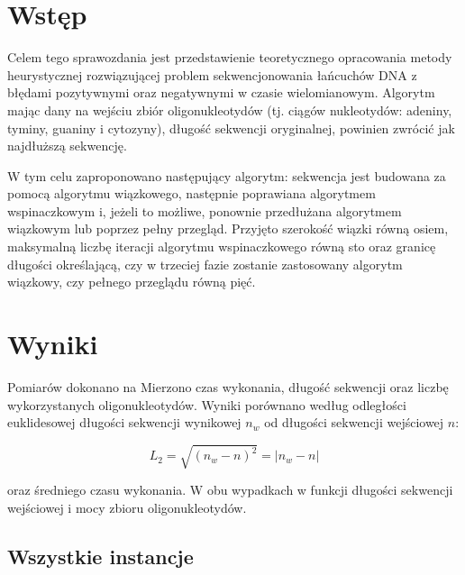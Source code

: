 \documentclass{article}
\begin{document}


\section{Wstęp}
Celem tego sprawozdania jest przedstawienie teoretycznego opracowania metody heurystycznej rozwiązującej problem sekwencjonowania łańcuchów DNA z błędami pozytywnymi oraz negatywnymi w czasie wielomianowym. Algorytm mając dany na wejściu zbiór oligonukleotydów (tj. ciągów nukleotydów: adeniny, tyminy, guaniny i cytozyny), długość sekwencji oryginalnej, powinien zwrócić jak najdłuższą sekwencję.

W tym celu zaproponowano następujący algorytm: sekwencja jest budowana za pomocą algorytmu wiązkowego, następnie poprawiana algorytmem wspinaczkowym i, jeżeli to możliwe, ponownie przedłużana algorytmem wiązkowym lub poprzez pełny przegląd. Przyjęto szerokość wiązki równą osiem, maksymalną liczbę iteracji algorytmu wspinaczkowego  równą sto oraz granicę długości określającą, czy w trzeciej fazie zostanie zastosowany algorytm wiązkowy, czy pełnego przeglądu równą pięć.
\section{Wyniki}

Pomiarów dokonano na %
Mierzono czas wykonania, długość sekwencji oraz liczbę wykorzystanych oligonukleotydów.
Wyniki porównano według odległości euklidesowej długości sekwencji wynikowej $n_w$ od długości sekwencji wejściowej $n$:

\begin{equation}
L_2 = \sqrt{(n_w-n)^2} = |n_w-n|
\end{equation}

oraz średniego czasu wykonania.
W obu wypadkach w funkcji długości sekwencji wejściowej i mocy zbioru oligonukleotydów.

\subsection{Wszystkie instancje}
\end{document}
